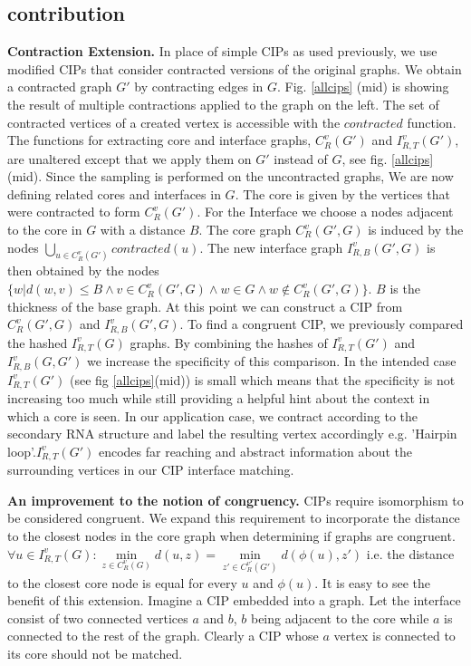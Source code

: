 \documentclass{article}
\begin{document}
\subsection{contribution}
\textbf{Contraction Extension.}
In place of simple CIPs as used previously,
we use modified CIPs that consider contracted versions
of the original graphs. We obtain a contracted graph $G'$ by contracting edges
in $G$. Fig. \ref{allcips} (mid) is showing the result of multiple contractions
applied to the graph on the left. The set of contracted vertices of a
created vertex is accessible with the $contracted$ function.
The functions for extracting core and interface graphs, 
$C_{R}^v(G')$ and $I_{R,T}^v(G')$, are unaltered except that we apply them
on $G'$ instead of $G$, see fig. \ref{allcips}(mid).
Since the sampling is performed on the uncontracted graphs,
We are now defining related cores and interfaces in $G$.
The core is given by the vertices that were contracted to form $C_{R}^v(G')$.
For the Interface we choose a nodes adjacent to the core in $G$ with a
distance $B$.
The core graph $C_{R}^v(G',G)$ is induced by the nodes 
$\bigcup\limits_{u \in C_R^v(G')} contracted(u)$.
The new interface graph $I_{R,B}^v(G',G)$ is then obtained by the nodes 
$\{ w | d(w,v) \leq B \wedge v\in C_R^v(G',G) \wedge w \in G \wedge w 
\notin C_R^v(G',G) \}$.  $B$ is the thickness of the base graph.
At this point we can construct a CIP from $C_R^v(G',G)$ and $I_{R,B}^v(G',G)$. 
To find a congruent CIP, we previously compared the hashed $I_{R,T}^v(G)$ 
graphs. By combining the hashes of $I_{R,T}^v(G')$ and $I_{R,B}^v(G,G')$ we
increase the specificity of this comparison.
In the intended case $I_{R,T}^v(G')$ (see fig \ref{allcips}(mid)) is small
which means that the
specificity is not increasing too much while still providing
a helpful hint about the context in which a core is seen.
In our application case, we contract according to the
secondary RNA structure and label the resulting vertex accordingly e.g.
'Hairpin loop'.$I_{R,T}^v(G')$  encodes far reaching and abstract
information about the surrounding vertices in our CIP interface matching.


\textbf{An improvement to the notion of congruency.}
CIPs require isomorphism to be considered congruent.
We expand this requirement to incorporate
the distance to the closest nodes in the core graph when 
determining if graphs are congruent.
$\forall u \in I_{R,T}^v(G) : 
\underset{z \in  C_{R}^v(G)}{\min} d(u,z) = 
\underset{z' \in  C_{R}^{v'}(G')}{\min} d(\phi(u),z') $ i.e. the distance 
to the closest core node is equal for every
$u$ and $\phi(u)$.
It is easy to see the benefit of this extension.
Imagine a CIP embedded into a graph. Let the interface consist of
two connected vertices $a$ and $b$, $b$ being adjacent to the core while
$a$ is connected to the rest of the graph.
Clearly a CIP whose $a$ vertex is connected to its core should not be matched.
\end{document}
